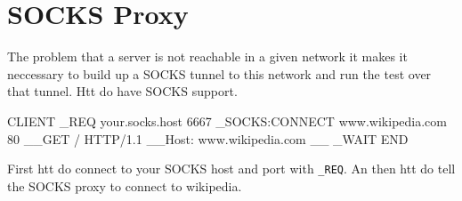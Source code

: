 \section{SOCKS Proxy}

The problem that a server is not reachable in a given network it makes
it neccessary to build up a SOCKS tunnel to this network and run the test
over that tunnel. Htt do have SOCKS support.

\begin{usplisting}
    CLIENT
      _REQ your.socks.host 6667 
      _SOCKS:CONNECT www.wikipedia.com 80
      __GET / HTTP/1.1
      __Host: www.wikipedia.com
      __
      _WAIT
    END
\end{usplisting}

First htt do connect to your SOCKS host and port with \texttt{\_REQ}.
An then htt do tell the SOCKS proxy to connect to wikipedia.

